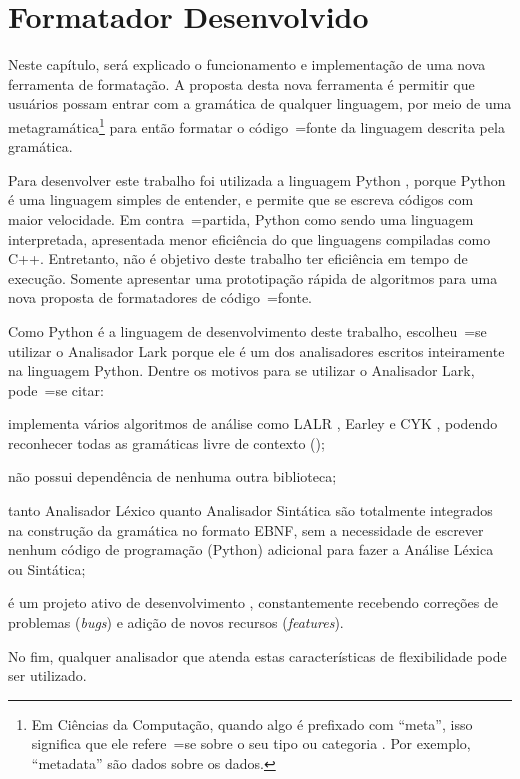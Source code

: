 

\chapter{Formatador Desenvolvido}
\label{chapter:software_implementation}

Neste capítulo,
será explicado o funcionamento e
implementação de uma nova ferramenta de formatação.
A proposta desta nova ferramenta é permitir que usuários possam entrar com a gramática de qualquer linguagem,
por meio de uma metagramática\footnote{
Em Ciências da Computação,
quando algo é prefixado com ``meta'',
isso significa que ele refere~=se sobre o seu tipo ou
categoria \cite{theUseOfMetaRules}.
Por exemplo,
``metadata'' são dados sobre os dados.
} para então formatar o código~=fonte da linguagem descrita pela gramática.

Para desenvolver este trabalho foi utilizada a linguagem Python \cite{webDevelopmentWithDjango},
porque Python é uma linguagem simples de entender,
e permite que se escreva códigos com maior velocidade.
Em contra~=partida,
Python como sendo uma linguagem interpretada,
apresentada menor eficiência do que linguagens compiladas como C++.
Entretanto,
não é objetivo deste trabalho ter eficiência em tempo de execução.
Somente apresentar uma prototipação rápida de algoritmos para uma nova proposta de formatadores de código~=fonte.

Como Python é a linguagem de desenvolvimento deste trabalho,
escolheu~=se utilizar o Analisador Lark porque ele é um dos analisadores escritos inteiramente na linguagem Python.
Dentre os motivos para se utilizar o Analisador Lark,
pode~=se citar:
\begin{inparaenum}[1)]
\item implementa vários algoritmos de análise como LALR \cite{lalrDeRemer1982},
Earley \cite{JayEarley} e CYK \cite{hopcroftBook},
podendo reconhecer todas as gramáticas livre de contexto ();
\item não possui dependência de nenhuma outra biblioteca;
\item tanto Analisador Léxico quanto Analisador Sintática são totalmente integrados na construção da gramática no formato EBNF,
sem a necessidade de escrever nenhum código de programação (Python) adicional para fazer a Análise Léxica ou
Sintática;
\item é um projeto ativo de desenvolvimento \cite{larkCommitHistory},
constantemente recebendo correções de problemas (\textit{bugs}) e
adição de novos recursos (\textit{features}).
\end{inparaenum}%
No fim,
qualquer analisador que atenda estas características de flexibilidade pode ser utilizado.

